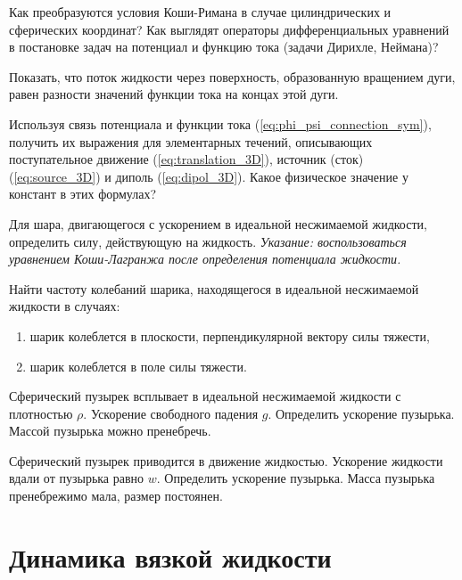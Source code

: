 \documentclass[a4paper, 14pt]{extarticle}
\begin{document}
\begin{problems}
	
	\item 
	Как преобразуются условия Коши-Римана в случае цилиндрических и сферических координат? Как выглядят операторы дифференциальных уравнений в постановке задач на потенциал и функцию тока (задачи Дирихле, Неймана)?
	
	\item Показать, что поток жидкости через поверхность, образованную вращением дуги, равен разности значений функции тока на концах этой дуги.
	
	\item Используя связь потенциала и функции тока (\ref{eq:phi_psi_connection_sym}), получить их выражения для элементарных течений, описывающих поступательное движение (\ref{eq:translation_3D}), источник (сток) (\ref{eq:source_3D}) и диполь (\ref{eq:dipol_3D}). Какое физическое значение у констант в этих формулах?
	
	\item 
	Для шара, двигающегося с ускорением в идеальной несжимаемой жидкости, определить силу, действующую на жидкость. \textit{Указание: воспользоваться уравнением Коши-Лагранжа после определения потенциала жидкости.}
	
	\item 
	Найти частоту колебаний шарика, находящегося в идеальной несжимаемой жидкости в случаях: 
	\begin{enumerate}
		\item шарик колеблется в плоскости, перпендикулярной вектору силы тяжести,
		\item шарик колеблется в поле силы тяжести.
	\end{enumerate}
	
	\item 
	Сферический пузырек всплывает в идеальной несжимаемой жидкости с плотностью $\rho$. Ускорение свободного падения $g$. Определить ускорение пузырька. Массой пузырька можно пренебречь.
	
	\item
	Сферический пузырек приводится в движение жидкостью. Ускорение жидкости вдали от пузырька равно $w$. Определить ускорение пузырька. Масса пузырька пренебрежимо мала, размер постоянен.
	
\end{problems}	

\section{Динамика вязкой жидкости}
\end{document}

